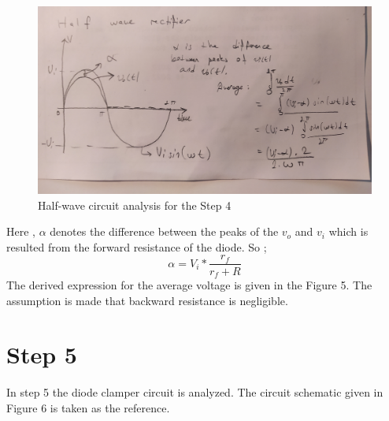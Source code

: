 \documentclass[letterpaper,12pt]{article}
\begin{document}
\begin{figure}[H]
    \centering
   \includegraphics[width=1\textwidth]{Q4.jpg}
   \caption{Half-wave circuit analysis for the Step 4}
\end{figure} 
Here , \(\alpha\) denotes the difference between the peaks of the \(v_o\) and \(v_i\) which is resulted from the forward resistance of the diode.
So ;
\[
    \alpha = V_i* \frac{r_f}{r_f + R }     
\]
The derived expression for the average voltage is given in the Figure 5. The assumption is made that backward resistance is negligible.
\section{Step 5}
 In step 5 the diode clamper circuit is analyzed. The circuit schematic given in Figure 6 is taken as the reference.
\end{document}
